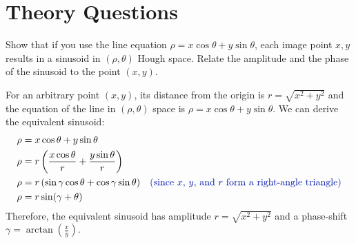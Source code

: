 \section{Theory Questions}
\label{sec:theory-questions}

\begin{problem}
  Show that if you use the line equation
  $\rho = x \cos \theta + y \sin \theta$,
  each image point $x, y$ results in a sinusoid in
  $(\rho, \theta)$ Hough space.
  Relate the amplitude and the phase of the sinusoid
  to the point $(x, y)$.
  \begin{Answer}
    For an arbitrary point $(x, y)$, its distance
    from the origin is $r = \sqrt{x^2 + y^2}$
    and the equation of the line in $(\rho, \theta)$ space
    is $\rho = x \cos \theta + y \sin \theta$.
    We can derive the equivalent sinusoid:
    \begin{align*}
      \rho &= x \cos \theta + y \sin \theta \\
      \rho &= r \left(\frac{x \cos \theta}{r} + \frac{y \sin \theta}{r} \right) \\
      \rho &= r \left(\sin \gamma \cos \theta + \cos \gamma \sin \theta \right) &\text{\zaff{ (since $x$, $y$, and $r$ form a right-angle triangle)}} \\
      \rho &= r \sin (\gamma + \theta)
    \end{align*}
    Therefore, the equivalent sinusoid has amplitude $r = \sqrt{x^2 + y^2}$
    and a phase-shift $\gamma = \arctan \left(\frac{x}{y} \right)$.
  \end{Answer}
\end{problem}

